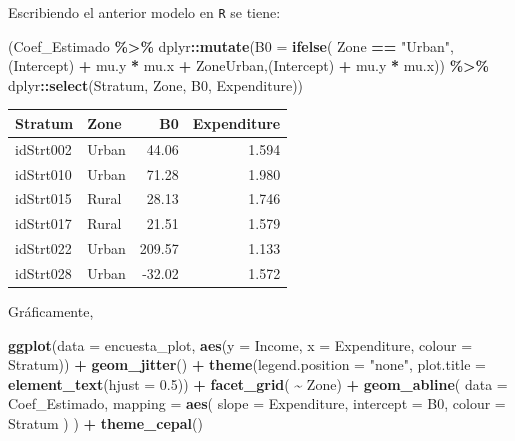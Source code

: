 \documentclass[
  spanish,
  12pt,
]{book}
\newenvironment{Shaded}{\begin{snugshade}}{\end{snugshade}}
\newcommand{\AttributeTok}[1]{\textcolor[rgb]{0.13,0.29,0.53}{#1}}
\newcommand{\FloatTok}[1]{\textcolor[rgb]{0.00,0.00,0.81}{#1}}
\newcommand{\FunctionTok}[1]{\textcolor[rgb]{0.13,0.29,0.53}{\textbf{#1}}}
\newcommand{\NormalTok}[1]{#1}
\newcommand{\SpecialCharTok}[1]{\textcolor[rgb]{0.81,0.36,0.00}{\textbf{#1}}}
\newcommand{\StringTok}[1]{\textcolor[rgb]{0.31,0.60,0.02}{#1}}
\begin{document}
Escribiendo el anterior modelo en \texttt{R} se tiene:

\begin{Shaded}
\begin{Highlighting}[]
\NormalTok{(Coef\_Estimado }\SpecialCharTok{\%\textgreater{}\%}\NormalTok{  dplyr}\SpecialCharTok{::}\FunctionTok{mutate}\NormalTok{(}\AttributeTok{B0 =} \FunctionTok{ifelse}\NormalTok{( Zone }\SpecialCharTok{==} \StringTok{"Urban"}\NormalTok{, }\StringTok{\textasciigrave{}}\AttributeTok{(Intercept)}\StringTok{\textasciigrave{}} \SpecialCharTok{+}\NormalTok{ mu.y }\SpecialCharTok{*}\NormalTok{ mu.x }\SpecialCharTok{+}\NormalTok{ ZoneUrban,}\StringTok{\textasciigrave{}}\AttributeTok{(Intercept)}\StringTok{\textasciigrave{}} \SpecialCharTok{+}\NormalTok{ mu.y }\SpecialCharTok{*}\NormalTok{ mu.x)) }\SpecialCharTok{\%\textgreater{}\%}
\NormalTok{  dplyr}\SpecialCharTok{::}\FunctionTok{select}\NormalTok{(Stratum, Zone, B0, Expenditure))}
\end{Highlighting}
\end{Shaded}

\begin{tabular}{l|l|r|r}
\hline
Stratum & Zone & B0 & Expenditure\\
\hline
idStrt002 & Urban & 44.06 & 1.594\\
\hline
idStrt010 & Urban & 71.28 & 1.980\\
\hline
idStrt015 & Rural & 28.13 & 1.746\\
\hline
idStrt017 & Rural & 21.51 & 1.579\\
\hline
idStrt022 & Urban & 209.57 & 1.133\\
\hline
idStrt028 & Urban & -32.02 & 1.572\\
\hline
\end{tabular}

Gráficamente,

\begin{Shaded}
\begin{Highlighting}[]
\FunctionTok{ggplot}\NormalTok{(}\AttributeTok{data =}\NormalTok{ encuesta\_plot,}
       \FunctionTok{aes}\NormalTok{(}\AttributeTok{y =}\NormalTok{ Income, }\AttributeTok{x =}\NormalTok{ Expenditure,}
           \AttributeTok{colour =}\NormalTok{ Stratum)) }\SpecialCharTok{+}
  \FunctionTok{geom\_jitter}\NormalTok{() }\SpecialCharTok{+}
  \FunctionTok{theme}\NormalTok{(}\AttributeTok{legend.position =} \StringTok{"none"}\NormalTok{,}
        \AttributeTok{plot.title =} \FunctionTok{element\_text}\NormalTok{(}\AttributeTok{hjust =} \FloatTok{0.5}\NormalTok{)) }\SpecialCharTok{+}
  \FunctionTok{facet\_grid}\NormalTok{( }\SpecialCharTok{\textasciitilde{}}\NormalTok{ Zone) }\SpecialCharTok{+}
  \FunctionTok{geom\_abline}\NormalTok{(}
    \AttributeTok{data =}\NormalTok{ Coef\_Estimado,}
    \AttributeTok{mapping =} \FunctionTok{aes}\NormalTok{(}
      \AttributeTok{slope =}\NormalTok{ Expenditure,}
      \AttributeTok{intercept =}\NormalTok{ B0,}
      \AttributeTok{colour =}\NormalTok{ Stratum}
\NormalTok{    )}
\NormalTok{  ) }\SpecialCharTok{+}
  \FunctionTok{theme\_cepal}\NormalTok{()}
\end{Highlighting}
\end{Shaded}
\end{document}

